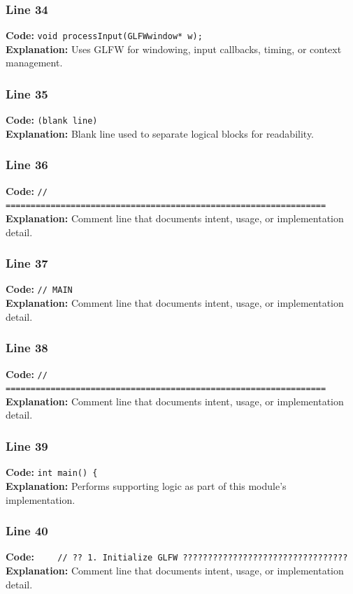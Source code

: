\documentclass[11pt,a4paper]{article}
\begin{document}
\subsubsection*{Line 34}
\textbf{Code:} \verb|void processInput(GLFWwindow* w);|\\
\textbf{Explanation:} Uses GLFW for windowing, input callbacks, timing, or context management.

\subsubsection*{Line 35}
\textbf{Code:} \texttt{(blank line)}\\
\textbf{Explanation:} Blank line used to separate logical blocks for readability.

\subsubsection*{Line 36}
\textbf{Code:} \verb|// ================================================================|\\
\textbf{Explanation:} Comment line that documents intent, usage, or implementation detail.

\subsubsection*{Line 37}
\textbf{Code:} \verb|// MAIN|\\
\textbf{Explanation:} Comment line that documents intent, usage, or implementation detail.

\subsubsection*{Line 38}
\textbf{Code:} \verb|// ================================================================|\\
\textbf{Explanation:} Comment line that documents intent, usage, or implementation detail.

\subsubsection*{Line 39}
\textbf{Code:} \verb|int main() {|\\
\textbf{Explanation:} Performs supporting logic as part of this module's implementation.

\subsubsection*{Line 40}
\textbf{Code:} \verb|    // ?? 1. Initialize GLFW ?????????????????????????????????|\\
\textbf{Explanation:} Comment line that documents intent, usage, or implementation detail.
\end{document}
